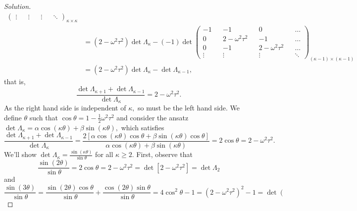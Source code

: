 \begin{proof}[Solution]
\begin{align*}
\begin{pmatrix}
         \vdots && \vdots && \vdots && \ddots
      \end{pmatrix}_{\kappa \times \kappa}\\
                           &= (2 - \omega^2 \tau^2) \det \Lambda_\kappa - (-1) \det \begin{pmatrix}
                              -1 && -1 && 0 && \dots\\
                              0 && 2 - \omega^2 \tau^2 && -1 && \dots\\
                              0 && -1 && 2- \omega^2 \tau^2 && \dots\\
                              \vdots && \vdots && \vdots && \ddots
                           \end{pmatrix}_{(\kappa-1) \times (\kappa-1)}\\
                           &= (2- \omega^2 \tau^2)\det \Lambda_\kappa - \det \Lambda_{\kappa -1},
   \end{align*}
   that is,
   \begin{equation*}
      \frac{\det{\Lambda_{\kappa+1}} + \det{\Lambda_{\kappa - 1}}}{\det{\Lambda_{\kappa}}} = 2 - \omega^2 \tau^2.
   \end{equation*}
   As the right hand side is independent of \(\kappa,\) so must be the left hand side. We define \(\theta\) such that \(\cos\theta = 1 - \frac12 \omega^2 \tau^2\) and consider the ansatz \(\det \Lambda_{\kappa} = \alpha \cos(\kappa \theta) + \beta \sin(\kappa \theta),\) which satisfies
   \begin{equation*}
      \frac{\det{\Lambda_{\kappa+1}} + \det{\Lambda_{\kappa - 1}}}{\det{\Lambda_{\kappa}}} = \frac{2\left[\alpha \cos(\kappa \theta) \cos\theta + \beta \sin(\kappa \theta) \cos \theta\right]}{\alpha \cos(\kappa \theta) + \beta \sin (\kappa \theta)} = 2 \cos\theta = 2 - \omega^2 \tau^2.
   \end{equation*}
   We'll show \(\det\Lambda_{\kappa} = \frac{\sin(\kappa \theta)}{\sin\theta}\) for all \(\kappa \geq 2.\) First, observe that
   \begin{equation*}
      \frac{\sin(2 \theta)}{\sin\theta} = 2\cos\theta = 2 - \omega^2 \tau^2 = \det[2 - \omega^2 \tau^2] = \det{\Lambda_{2}}
   \end{equation*}
   and
   \begin{equation*}
      \frac{\sin(3 \theta)}{\sin\theta} = \frac{\sin(2\theta) \cos\theta}{\sin\theta} + \frac{\cos(2\theta)\sin\theta}{\sin\theta} = 4\cos^2\theta - 1 = (2 - \omega^2 \tau^2)^2 - 1 = \det\left(\begin{smallmatrix}

\end{smallmatrix}
\end{equation*}
\end{proof}
